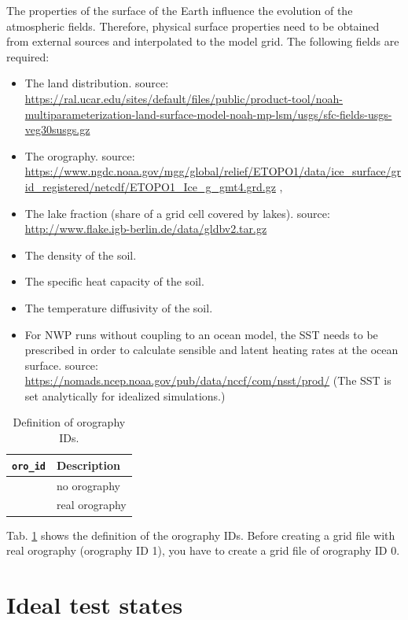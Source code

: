\documentclass[10pt]{report}
\begin{document}
The properties of the surface of the Earth influence the evolution of the atmospheric fields. Therefore, physical surface properties need to be obtained from external sources and interpolated to the model grid. The following fields are required:
%
\begin{itemize}
\item The land distribution. source: \url{https://ral.ucar.edu/sites/default/files/public/product-tool/noah-multiparameterization-land-surface-model-noah-mp-lsm/usgs/sfc-fields-usgs-veg30susgs.gz} \cite{glcc}
\item The orography. source: \url{https://www.ngdc.noaa.gov/mgg/global/relief/ETOPO1/data/ice_surface/grid_registered/netcdf/ETOPO1_Ice_g_gmt4.grd.gz} \cite{etopo1}, \cite{etopo1_add}
\item The lake fraction (share of a grid cell covered by lakes). source: \url{http://www.flake.igb-berlin.de/data/gldbv2.tar.gz} \cite{gldb}
\item The density of the soil.
\item The specific heat capacity of the soil.
\item The temperature diffusivity of the soil.
\item For NWP runs without coupling to an ocean model, the SST needs to be prescribed in order to calculate sensible and latent heating rates at the ocean surface. source: \url{https://nomads.ncep.noaa.gov/pub/data/nccf/com/nsst/prod/} (The SST is set analytically for idealized simulations.)
\end{itemize}

\renewcommand{\arraystretch}{1.2}
\begin{table}
\centering
\begin{tabular}{|>{\centering}p{4.0 cm}|>{\centering}p{8 cm}|}
\hline \textbf{\texttt{oro\_id}} & \textbf{Description} \tabularnewline
\hline\hline 0 & no orography \tabularnewline
\hline 1 & real orography \tabularnewline
\hline
\end{tabular}
\caption{Definition of orography IDs.}
\label{tab:oro_id_definition}
\end{table}
\renewcommand{\arraystretch}{1}

Tab. \ref{tab:oro_id_definition} shows the definition of the orography IDs. Before creating a grid file with real orography (orography ID 1), you have to create a grid file of orography ID 0.

\chapter{Ideal test states}
\label{chap:ideal_test_states}
\end{document}
